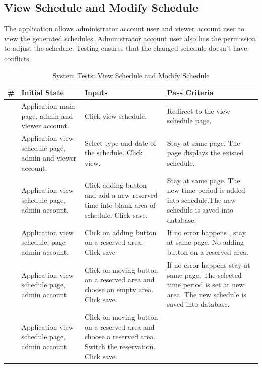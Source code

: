 \documentclass[12pt]{article}
\newcounter{TestCounter}
\begin{document}
\subsection{View Schedule and Modify Schedule}
The application allows administrator account user and viewer account user to view the generated schedules. Administrator account user also has the permission to adjust the schedule. Testing ensures that the changed schedule doesn’t have conflicts. 
\begin{center}
	\begin{longtable}{c>{\raggedright\arraybackslash}p{4.8cm} >{\raggedright\arraybackslash}p{3cm}>{\raggedright\arraybackslash}p{3cm}}
		\caption{System Tests: View Schedule and Modify Schedule}\label{ViewSchedule_SystemTests}\\
		\toprule
		\bf \# & \bf Initial State & \bf Inputs & \bf Pass Criteria \\\midrule
		\stepcounter{TestCounter}\arabic{TestCounter} 
		& Application main page, admin and viewer account.
		& Click view schedule. 
		& Redirect to the view schedule page.
		\\\midrule
		\stepcounter{TestCounter}\arabic{TestCounter} 
		& Application view schedule page, admin and viewer account.
		& Select type and date of the schedule. Click view.
		& Stay at same page. The page displays the existed schedule.
		\\\midrule
		\stepcounter{TestCounter}\arabic{TestCounter} 
		& Application view schedule page, admin account.
		& Click adding button and add a new reserved time into blank area of schedule. Click save.
		& Stay at same page. The new time period is added into schedule.The new schedule is saved into database.
		\\\midrule
		\stepcounter{TestCounter}\arabic{TestCounter} 
		& Application view schedule, page admin account.
		& Click on adding button on a reserved area. Click save 
		& If no error happens , stay at same page. No adding button on a reserved area.
		\\\midrule
		\stepcounter{TestCounter}\arabic{TestCounter} 
		& Application view schedule page, admin account 
		& Click on moving button on a reserved area and choose an empty area. Click save.
		& If no error happens stay at same page. The selected time period is set at new area. The new schedule is saved into database.
		\\\midrule
		\stepcounter{TestCounter}\arabic{TestCounter} 
		& Application view schedule page, admin account 
		& Click on moving button on a reserved area and choose a reserved area. Switch the reservation. Click save.

\end{longtable}
\end{center}
\end{document}
